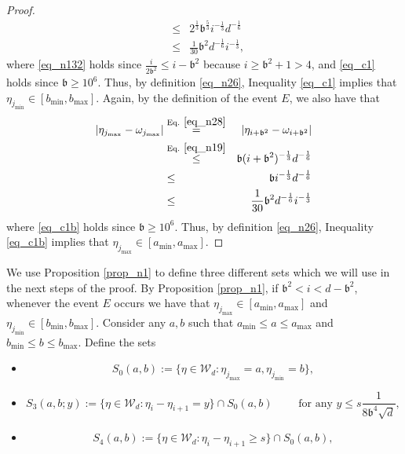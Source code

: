 \documentclass[11pt,letterpaper]{article}
\begin{document}
\begin{proof}
\begin{eqnarray}
    &\leq & 2^{\frac{1}{3}}\mathfrak{b}^{\frac{5}{3}} i^{-\frac{1}{3}} d^{-\frac{1}{6}}\nonumber\\
    &\leq &\frac{1}{30} \mathfrak{b}^2 d^{-\frac{1}{6}} i^{-\frac{1}{3}},  \label{eq_c1}
\end{eqnarray}
%
where \eqref{eq_n132} holds since $\frac{i}{2\mathfrak{b}^2} \leq i-\mathfrak{b}^2$ because $i \geq \mathfrak{b}^2 +1 > 4$, and \eqref{eq_c1} holds since $\mathfrak{b} \geq 10^6$.
%
Thus, by definition \eqref{eq_n26}, Inequality \eqref{eq_c1} implies that $\eta_{j_{\mathrm{min}}}  \in[b_{\mathrm{min}}, b_{\mathrm{max}}]$. 
%
Again, by the definition of the event $E$, we also have that 
%
\begin{eqnarray}
   |\eta_{j_{\mathrm{max}}} -  \omega_{j_{\mathrm{max}}}| 
   &\stackrel{\textrm{Eq. } \eqref{eq_n28}}{=}&  |\eta_{i+ \mathfrak{b}^2} -  \omega_{i+ \mathfrak{b}^2}| \nonumber\\ &\stackrel{\textrm{Eq. } \eqref{eq_n19}}{\leq} &  \mathfrak{b} (i+\mathfrak{b}^2)^{-\frac{1}{3}} d^{-\frac{1}{6}}\nonumber\\
    &\leq &\mathfrak{b} i^{-\frac{1}{3}} d^{-\frac{1}{6}}\nonumber\\
    &\leq & \frac{1}{30} \mathfrak{b}^2 d^{-\frac{1}{6}} i^{-\frac{1}{3}} \label{eq_c1b}
\end{eqnarray}
%
where \eqref{eq_c1b} holds since $\mathfrak{b} \geq 10^6$.
%
Thus, by definition \eqref{eq_n26}, Inequality \eqref{eq_c1b} implies that $\eta_{j_{\mathrm{max}}}  \in[a_{\mathrm{min}}, a_{\mathrm{max}}]$.
%
\end{proof}
%
\noindent
We use Proposition \ref{prop_n1} to define three different sets which we will use in the next steps of the proof.
%
By Proposition \ref{prop_n1}, if $\mathfrak{b}^2 < i < d-\mathfrak{b}^2$, whenever the event $E$ occurs we have that $ \eta_{j_{\mathrm{max}}}  \in[a_{\mathrm{min}}, a_{\mathrm{max}}]$ and  $ \eta_{j_{\mathrm{min}}}  \in[b_{\mathrm{min}}, b_{\mathrm{max}}]$.
%
Consider any $a,b$ such that $a_{\mathrm{min}} \leq a \leq  a_{\mathrm{max}}$  and $b_{\mathrm{min}} \leq b \leq  b_{\mathrm{max}}$.
%
 Define the sets 
\begin{itemize}
\item \begin{equation}\label{eq_n25}
    S_0(a,b):= \{ \eta \in \mathcal{W}_d : \eta_{j_{\mathrm{max}}} = a, \eta_{j_{\mathrm{min}}} = b\},
\end{equation}

\item  
\begin{equation}\label{eq_n22}
S_3(a,b; y) :=  \{\eta \in \mathcal{W}_d : \eta_i-\eta_{i+1} = y\} \cap S_0(a,b) \qquad \textrm{ for any } y \leq s\frac{1}{8\mathfrak{b}^4\sqrt{d} }, 
\end{equation}

\item 
\begin{equation*}
S_4(a,b) :=  \{\eta \in \mathcal{W}_d : \eta_i-\eta_{i+1} \geq s\} \cap S_0(a,b),
\end{equation*}

\end{itemize}
\end{document}
